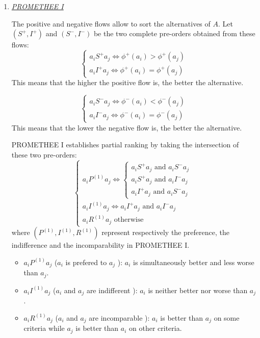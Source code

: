 \begin{enumerate}
\item \textit{\underline{PROMETHEE I}}

The positive and negative flows allow to sort the alternatives of $A$. Let $(S^{+}, I^{+})$ and $(S^{-}, I^{-})$ be the two complete pre-orders obtained from these flows:
\begin{equation}
\begin{cases}
a_iS^{+}a_j \Leftrightarrow \phi^{+}(a_i) > \phi^{+}(a_j)\\
a_iI^{+}a_j \Leftrightarrow \phi^{+}(a_i) = \phi^{+}(a_j)
\end{cases}
\end{equation}
This means that the higher the positive flow is, the better the alternative.

\begin{equation}
\begin{cases}
a_iS^{-}a_j \Leftrightarrow \phi^{-}(a_i) < \phi^{-}(a_j)\\
a_iI^{-}a_j \Leftrightarrow \phi^{-}(a_i) = \phi^{-}(a_j)
\end{cases}
\end{equation}
This means that the lower the negative flow is, the better the alternative.

PROMETHEE I establishes partial ranking by taking the intersection of these two pre-orders:
\begin{equation}
\begin{cases}
a_iP^{(1)}a_j \Leftrightarrow \begin{cases}
	a_iS^{+}a_j \text{ and } a_iS^{-}a_j\\
	a_iS^{+}a_j \text{ and } a_iI^{-}a_j\\
	a_iI^{+}a_j \text{ and } a_iS^{-}a_j
	\end{cases}\\
a_iI^{(1)}a_j \Leftrightarrow a_iI^{+}a_j \text{ and } a_iI^{-}a_j\\
a_iR^{(1)}a_j \text{ otherwise}
\end{cases}
\end{equation}
where $(P^{(1)}, I^{(1)}, R^{(1)})$ represent respectively the preference, the indifference and the incomparability in PROMETHEE I.
\begin{itemize}
\item $a_iP^{(1)}a_j$ (\og $a_i$ is prefered to $a_j$ \fg): $a_i$ is simultaneously better and less worse than $a_j$.
\item $a_iI^{(1)}a_j$ (\og $a_i$ and $a_j$ are indifferent \fg): $a_i$ is neither better nor worse than $a_j$.
\item $a_iR^{(1)}a_j$ (\og $a_i$ and $a_j$ are incomparable \fg): $a_i$ is better than $a_j$ on some criteria while $a_j$ is better than $a_i$ on other criteria.
\end{itemize}


\end{enumerate}
